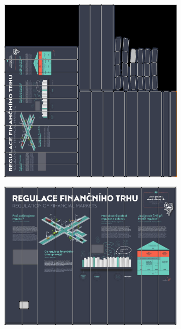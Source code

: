 \begin{figure}[!b]\centering
    \begin{subfigure}[b]{0.5\textwidth}
        \centering
        \includegraphics[width=\textwidth]{img/appendix/panel-bake-uv.png}
    \end{subfigure}
    \hfill
    \begin{subfigure}[b]{0.6\textwidth}
        \centering
        \includegraphics[width=\textwidth]{img/appendix/panel-bake-original.png}
    \end{subfigure}
\end{figure}